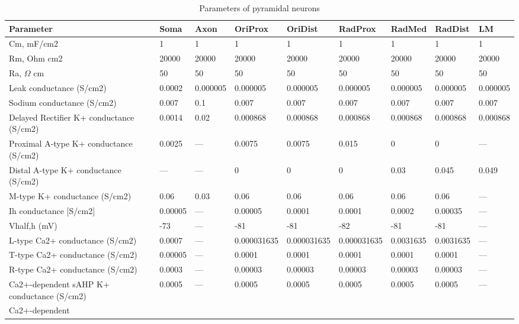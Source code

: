 \documentclass[12pt]{article}
\begin{document}
\begin{table}[h]
	\caption{ Parameters of pyramidal neurons  }
	\label{table:ca1_pyramidal_cell_parameters}
	\begin{center}
		\begin{tabular}{ |p{2cm} | p{1.25cm} |p{1.25cm} |p{1.25cm} |p{1.25cm} |p{1.25cm} |p{1.25cm} |p{1.25cm} |p{1.25cm} | }
			\hline
			\textbf{Parameter} & \textbf{Soma} & \textbf{Axon} & \textbf{OriProx} & \textbf{OriDist} & \textbf{RadProx} & \textbf{RadMed} & \textbf{RadDist} & \textbf{LM} \\ \hline
			Cm, mF/cm2 & 1 & 1 & 1 & 1 & 1 & 1 & 1 & 1 \\ \hline Rm, Ohm cm2 & 20000 & 20000 & 20000 & 20000 & 20000 & 20000 & 20000 & 20000 \\ \hline  Ra, $\Omega$ cm & 50 & 50 & 50 & 50 & 50 & 50 & 50 & 50 \\ \hline Leak conductance (S/cm2) & 0.0002 & 0.000005 & 0.000005 & 0.000005 & 0.000005 & 0.000005 & 0.000005 & 0.000005 \\ \hline  Sodium conductance (S/cm2) & 0.007 & 0.1 & 0.007 & 0.007 & 0.007 & 0.007 & 0.007 & 0.007 \\ \hline  Delayed Rectifier K+ conductance (S/cm2) & 0.0014 & 0.02 & 0.000868 & 0.000868 & 0.000868 & 0.000868 & 0.000868 & 0.000868 \\ \hline  Proximal A-type K+ conductance (S/cm2) & 0.0025 & --- & 0.0075 & 0.0075 & 0.015 & 0 & 0 & --- \\ \hline  Distal A-type K+ conductance (S/cm2) & --- & --- & 0 & 0 & 0 & 0.03 & 0.045 & 0.049 \\ \hline  M-type K+ conductance (S/cm2) & 0.06 & 0.03 & 0.06 & 0.06 & 0.06 & 0.06 & 0.06 & --- \\ \hline  Ih conductance [S/cm2] & 0.00005 & --- & 0.00005 & 0.0001 & 0.0001 &  0.0002 & 0.00035 & --- \\ \hline  Vhalf,h (mV) & -73 & --- & -81 & -81 & -82 & -81 & -81 & --- \\ \hline  L-type Ca2+ conductance (S/cm2) & 0.0007 & --- & 0.000031635 & 0.000031635 & 0.000031635 & 0.0031635 & 0.0031635 & --- \\ \hline  T-type Ca2+ conductance (S/cm2) & 0.00005 & --- & 0.0001 & 0.0001 & 0.0001 & 0.0001 & 0.0001 & --- \\ \hline  R-type Ca2+ conductance (S/cm2) & 0.0003 & --- & 0.00003 & 0.00003 & 0.00003 & 0.00003 & 0.00003 & --- \\ \hline  Ca2+-dependent sAHP  K+ conductance (S/cm2) & 0.0005 & --- & 0.0005 & 0.0005 & 0.0005 & 0.0005 & 0.0005 & --- \\ \hline  Ca2+-dependent 
\end{tabular}
\end{center}
\end{table}
\end{document}
